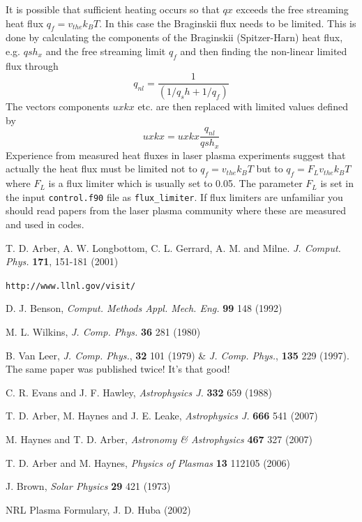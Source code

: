 \documentclass[11pt]{article}
\begin{document}
It is possible that sufficient heating occurs so that $qx$ exceeds the free streaming heat flux $q_f=v_{the} k_B T$. In this case the Braginskii flux needs to be limited. This is done by calculating the components of the Braginskii (Spitzer-Harn) heat flux, e.g. $qsh_x$ and the free streaming limit $q_f$ and then finding the non-linear limited flux through
\[
q_{nl} = \frac{1}{(1/q_sh + 1/q_f)}
\] 
The vectors components $uxkx$ etc. are then replaced with limited values defined by 
\[
uxkx=uxkx\frac{q_{nl}}{qsh_x}
\]
Experience from measured heat fluxes in laser plasma experiments suggest that actually the heat flux must be limited not to $q_f=v_{the} k_B T$ but to $q_f=F_L v_{the} k_B T$  where $F_L$ is a flux limiter which is usually set to 0.05. The parameter $F_L$ is set in the input \texttt{control.f90} file as \texttt{flux\_limiter}. If flux limiters are unfamiliar you should read papers from the laser plasma community where these are measured and used in codes.

\newpage
\begin{thebibliography}{}

 T. D. Arber, A. W. Longbottom, C. L. Gerrard, A. M. and Milne. \textit{J. Comput. Phys.} \textbf{171}, 151-181 (2001)

 \texttt{http://www.llnl.gov/visit/}

 D. J. Benson, \textit{Comput. Methods Appl. Mech. Eng.} \textbf{99} 148 (1992) 

 M. L. Wilkins, \textit{J. Comp. Phys.} \textbf{36} 281 (1980)

 B. Van Leer, \textit{J. Comp. Phys.}, \textbf{32} 101 (1979)  \& \textit{J. Comp. Phys.}, \textbf{135} 229 (1997). The same paper was published twice! It's that good!

 C. R. Evans and J. F. Hawley, \textit{Astrophysics J.} \textbf{332} 659 (1988) 

 T. D. Arber, M. Haynes and J. E. Leake, {\it Astrophysics J.} \textbf{666} 541 (2007)

 M. Haynes and T. D. Arber, \textit{Astronomy \& Astrophysics } \textbf{467} 327 (2007)

 T. D. Arber and M. Haynes, \textit{Physics of Plasmas} \textbf{13} 112105 (2006)

 J. Brown, \textit{Solar Physics} \textbf{29} 421 (1973)

 NRL Plasma Formulary, J. D. Huba (2002)

\end{thebibliography}
\end{document}
